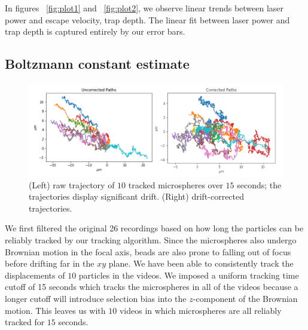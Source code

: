 \documentclass[aps,prb,twocolumn,superscriptaddress,floatfix,longbibliography,citeautoscript]{revtex4-2}
\begin{document}
In figures ~\ref{fig:plot1} and ~\ref{fig:plot2}, we observe linear trends between laser power and escape velocity, trap depth. The linear fit between laser power and trap depth is captured entirely by our error bars.



\subsection{Boltzmann constant estimate \label{sec:boltzmannCalc}}



\begin{figure}
    \centering
    \includegraphics[width=1\linewidth]{Second_draft/figs/paths.png}
    \caption{(Left) raw trajectory of $10$ tracked microspheres over $15$ seconds; the trajectories display significant drift. (Right) drift-corrected trajectories.}
    \label{fig:trajCorrected}
\end{figure}
We first filtered the original 26 recordings based on how long the particles can be reliably tracked by our tracking algorithm. Since the microspheres also undergo Brownian motion in the focal axis, beads are also prone to falling out of focus before drifting far in the $xy$ plane. We have been able to consistently track the displacements of $10$ particles in the videos. We imposed a uniform tracking time cutoff of 15 seconds which tracks the microspheres in all of the videos because a longer cutoff will introduce selection bias into the $z$-component of the Brownian motion. This leaves us with $10$ videos in which microspheres are all reliably tracked for $15$ seconds. 
\end{document}
